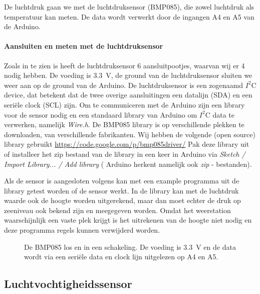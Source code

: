 De luchtdruk gaan we met de luchtdruksensor (BMP085), die zowel luchtdruk als
temperatuur kan meten. De data wordt verwerkt door de ingangen A4 en A5 van
de Arduino.

\paragraph{Aansluiten en meten met de luchtdruksensor}

Zoals in  te zien is heeft de luchtdruksensor 6
aansluitpootjes, waarvan wij er 4 nodig hebben. De voeding is
\SI{3.3}{\volt}, de ground van de luchtdruksensor sluiten we weer aan op
de ground van de Arduino. De luchtdruksensor is een zogenaamd $I^{2}$C
device, dat betekent dat de twee overige aansluitingen een datalijn
(SDA) en een seriële clock (SCL) zijn. Om te communiceren met de
Arduino zijn een library voor de sensor nodig en een standaard library
van Arduino om $I^{2}$C data te verwerken, namelijk \emph{Wire.h}. De BMP085
library is op verschillende plekken te downloaden, van verschillende
fabrikanten. Wij hebben de volgende (open source) library gebruikt
\url{https://code.google.com/p/bmp085driver/} Pak deze library uit of
installeer het zip bestand van de library in een keer in Arduino via \emph{Sketch /
Import Library... / Add library} ( Arduino herkent namelijk ook \emph{zip} - bestanden).

Als de sensor is aangesloten volgens 
kan met een example programma uit de library getest worden of de sensor
werkt. In de library kan met de luchtdruk waarde ook de hoogte worden
uitgerekend, maar dan moet echter de druk op zeeniveau ook bekend zijn
en meegegeven worden. Omdat het weerstation waarschijnlijk een vaste plek
krijgt is het uitrekenen van de hoogte niet nodig en deze programma
regels kunnen verwijderd worden.

\begin{figure}
    \centering
    \hfill
    \caption{De BMP085 los en in een schakeling. De voeding is \SI{3.3}{\volt}
    en de data wordt via een seri\"{e}le data en clock lijn uitgelezen op A4 en A5.}
\end{figure}


\subsection{Luchtvochtigheidssensor}

